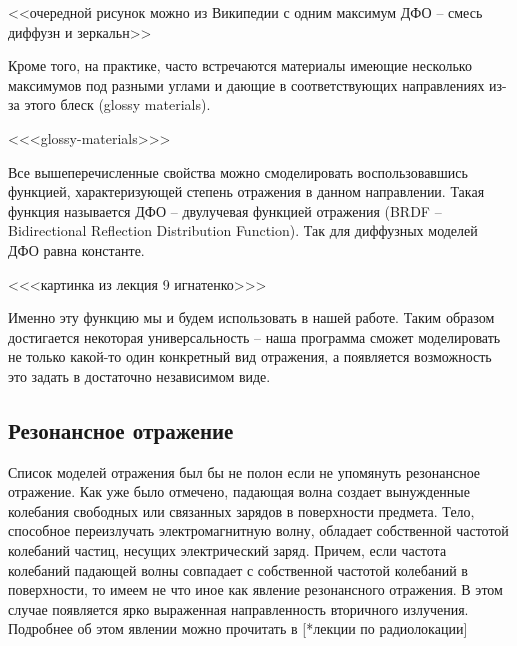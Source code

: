 <<очередной рисунок можно из Википедии с одним максимум ДФО -- смесь диффузн и зеркальн>>

Кроме того, на практике, часто встречаются материалы имеющие несколько максимумов под разными углами и дающие в соответствующих направлениях из-за этого блеск (glossy materials).

<<<glossy-materials>>>

Все вышеперечисленные свойства можно смоделировать воспользовавшись функцией, характеризующей степень отражения в данном направлении. Такая функция называется ДФО -- двулучевая функцией отражения (BRDF -- Bidirectional Reflection Distribution Function). Так для диффузных моделей ДФО равна константе. 

<<<картинка из лекция 9 игнатенко>>> 

Именно эту функцию мы и будем использовать в нашей работе. Таким образом достигается некоторая универсальность -- наша программа сможет моделировать не только какой-то один конкретный вид отражения, а появляется возможность это задать в достаточно независимом виде. 

\subsection*{Резонансное отражение}

Список моделей отражения был бы не полон если не упомянуть резонансное отражение. Как уже было отмечено, падающая волна создает вынужденные колебания свободных или связанных зарядов в поверхности предмета. Тело, способное переизлучать электромагнитную волну, обладает собственной частотой колебаний частиц, несущих электрический заряд. Причем, если частота колебаний падающей волны совпадает с собственной частотой колебаний в поверхности, то имеем не что иное как явление резонансного отражения. В этом случае появляется ярко выраженная направленность вторичного излучения. Подробнее об этом явлении можно прочитать в [*лекции по радиолокации]


